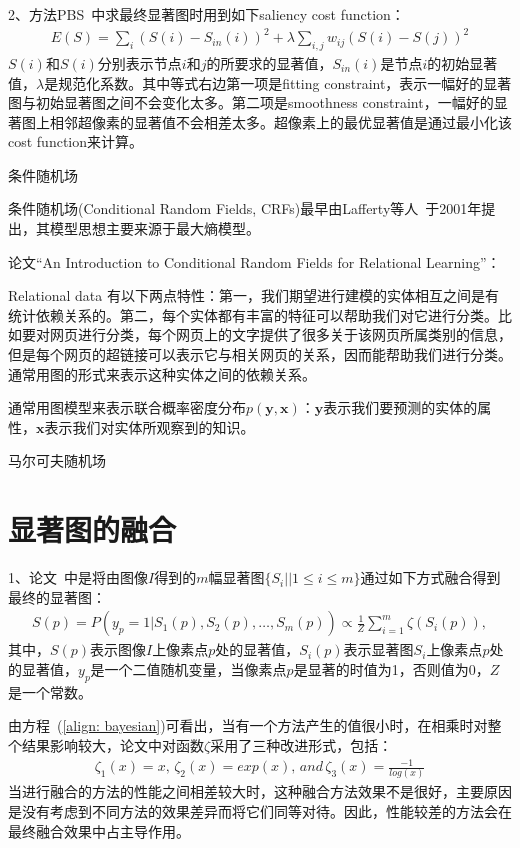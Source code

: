 \documentclass[12pt]{article}
\begin{document}
2、方法PBS~\cite{yang2013graph}中求最终显著图时用到如下saliency cost function：
\begin{align}
E(S) = \sum_i(S(i)-S_{in}(i))^2+\lambda\sum_{i,j}w_{ij}(S(i)-S(j))^2
\end{align}
$S(i)$和$S(i)$分别表示节点$i$和$j$的所要求的显著值，$S_{in}(i)$是节点$i$的初始显著值，$\lambda$是规范化系数。其中等式右边第一项是fitting constraint，表示一幅好的显著图与初始显著图之间不会变化太多。第二项是smoothness constraint，一幅好的显著图上相邻超像素的显著值不会相差太多。超像素上的最优显著值是通过最小化该cost function来计算。

条件随机场

条件随机场(Conditional Random Fields, CRFs)最早由Lafferty等人~\cite{lafferty2001conditional}于2001年提出，其模型思想主要来源于最大熵模型。

论文``An Introduction to Conditional Random Fields for Relational Learning''：

Relational data 有以下两点特性：第一，我们期望进行建模的实体相互之间是有统计依赖关系的。第二，每个实体都有丰富的特征可以帮助我们对它进行分类。比如要对网页进行分类，每个网页上的文字提供了很多关于该网页所属类别的信息，但是每个网页的超链接可以表示它与相关网页的关系，因而能帮助我们进行分类。通常用图的形式来表示这种实体之间的依赖关系。

通常用图模型来表示联合概率密度分布$p(\mathbf{y}, \mathbf{x})$：$\mathbf{y}$表示我们要预测的实体的属性，$\mathbf{x}$表示我们对实体所观察到的知识。




马尔可夫随机场

\section{显著图的融合}

1、论文~\cite{borji2012salient}中是将由图像$I$得到的$m$幅显著图$\{S_i||1 \le i \le m \}$通过如下方式融合得到最终的显著图：
\begin{align}
S(p) = P(y_p=1|S_1(p), S_2(p), \ldots, S_m(p))\propto \frac{1}{Z} \sum_{i=1}^{m} \zeta(S_i(p)), 
\label{align: bayesian}
\end{align}
其中，$S(p)$表示图像$I$上像素点$p$处的显著值，$S_i(p)$表示显著图$S_i$上像素点$p$处的显著值，$y_p$是一个二值随机变量，当像素点$p$是显著的时值为1，否则值为0，$Z$是一个常数。

由方程~(\ref{align: bayesian})可看出，当有一个方法产生的值很小时，在相乘时对整个结果影响较大，论文中对函数$\zeta$采用了三种改进形式，包括：
\begin{align}
\zeta_1(x) = x, \, \zeta_2(x) = exp(x), \,and \, \zeta_3(x) = \frac{-1}{log(x)}
\end{align}
当进行融合的方法的性能之间相差较大时，这种融合方法效果不是很好，主要原因是没有考虑到不同方法的效果差异而将它们同等对待。因此，性能较差的方法会在最终融合效果中占主导作用。
\end{document}
